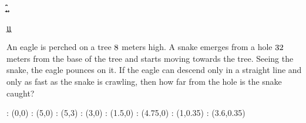 


\FRACTIONSIMPLIFY\va\vb\a\b %
{}\a\b\c\d %
\FRACMULT\a\b\a\b\e\f %
{}\e\f\x\y %
\FRACDIV\c\d\x\y\m\n

\FRACMULT\n\m{}\j\k
\FRACMINUS{}\j\k\ansx\ansy

\question[4] An eagle is perched on a tree $8$ meters high. A snake emerges 
from a hole $32$ meters from the base of the tree and starts moving 
towards the tree. Seeing the snake, the eagle pounces on it. If the eagle can descend 
only in a straight line and only as fast as the snake is crawling, then how far from 
the hole is the snake caught?

\watchout[-70pt]

\ifprintanswers
		\vspace{0.75cm}
    : (0,0)
    : (5,0)
    : (5,3)
    : (3,0)
    : (1.5,0)
    : (4.75,0)
    : (1,0.35)
    : (3.6,0.35)
  	\figdrawbegin{}
    \figdrawline [1,2,3,1]
    \figdrawline [3,4]
    \figdrawend
    \centerline{\box\figBoxA}
\fi 



